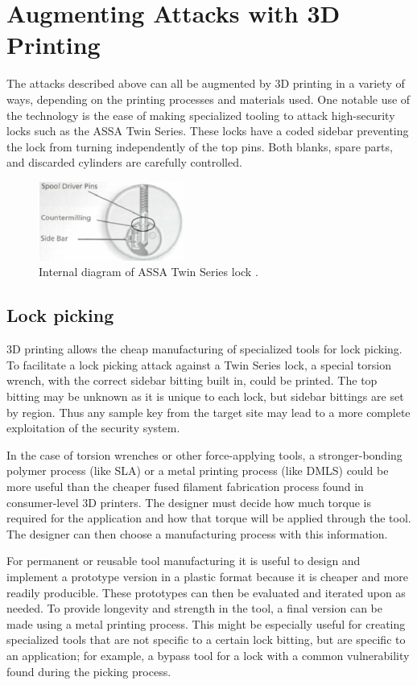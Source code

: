 \documentclass{acm_proc_article-sp}
\begin{document}
\section{Augmenting Attacks with 3D Printing}
The attacks described above can all be augmented by 3D printing in a variety of ways, depending on the printing processes and materials used. One notable use of the technology is the ease of making specialized tooling to attack high-security locks such as the ASSA Twin Series. These locks have a coded sidebar preventing the lock from turning independently of the top pins. Both blanks, spare parts, and discarded cylinders are carefully controlled.

\begin{figure}[htb]
    \centering
    \includegraphics{spool}
    \caption{Internal diagram of ASSA Twin Series lock \cite{TOOOL2}.}
    \label{spool}
\end{figure}

\subsection{Lock picking}
3D printing allows the cheap manufacturing of specialized tools for lock picking. To facilitate a lock picking attack against a Twin Series lock, a special torsion wrench, with the correct sidebar bitting built in, could be printed. The top bitting may be unknown as it is unique to each lock, but sidebar bittings are set by region. Thus any sample key from the target site may lead to a more complete exploitation of the security system.

In the case of torsion wrenches or other force-applying tools, a stronger-bonding polymer process (like SLA) or a metal printing process (like DMLS) could be more useful than the cheaper fused filament fabrication process found in consumer-level 3D printers. The designer must decide how much torque is required for the application and how that torque will be applied through the tool. The designer can then choose a manufacturing process with this information.

For permanent or reusable tool manufacturing it is useful to design and implement a prototype version in a plastic format because it is cheaper and more readily producible. These prototypes can then be evaluated and iterated upon as needed. To provide longevity and strength in the tool, a final version can be made using a metal printing process. This might be especially useful for creating specialized tools that are not specific to a certain lock bitting, but are specific to an application; for example, a bypass tool for a lock with a common vulnerability found during the picking process.
\end{document}
